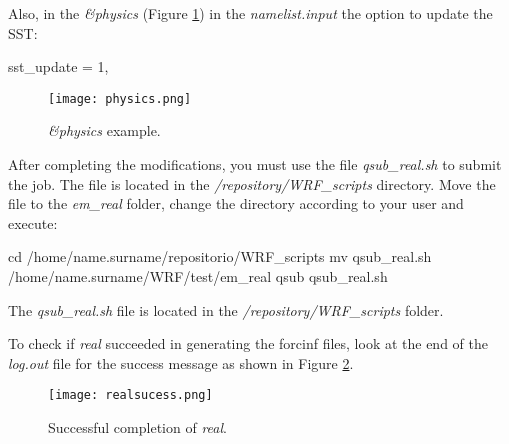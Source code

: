 \noindent Also, in the \textit{\&physics} (Figure \textcolor{bleu_cite}{\ref{physicsnamelist}}) in the \textit{namelist.input} 
the option to update the SST:
\bigskip

\begin{bashcode}
sst_update = 1,
\end{bashcode}
\bigskip

\begin{figure}[H]
    \centering
    \texttt{[image: physics.png]}
    \caption{\textit{\&physics} example.}
    \label{physicsnamelist}
\end{figure}
\bigskip

\noindent After completing the modifications, you must use the file \textit{qsub\_real.sh} to submit the job.
The file is located in the \textit{/repository/WRF\_scripts} directory. Move the file to the \textit{em\_real} folder, change the directory 
according to your user and execute:
\bigskip

\begin{bashcode}
cd /home/name.surname/repositorio/WRF_scripts
mv qsub_real.sh /home/name.surname/WRF/test/em_real
qsub qsub_real.sh
\end{bashcode}
\bigskip

\begin{tcolorbox}[enhanced,
  grow to left by=0cm,%
  grow to right by=0cm,%
  enlarge top by=0cm,%
  enlarge bottom by=0cm,%
  tcbox raise base,
  boxrule=1.0pt,
  left=18mm,
  colframe=yellow!50!black,coltext=yellow!25!black,colback=yellow!10!white,
  overlay={\begin{tcbclipinterior}\fill[yellow!75!blue!50!white] (frame.south west)
    rectangle node[text=white,font=\sffamily\bfseries\footnotesize,rotate=0] {ATTENTION} ([xshift=18mm]frame.north west);\end{tcbclipinterior}}]
The \textit{qsub\_real.sh} file is located in the \textit{/repository/WRF\_scripts} folder.
\end{tcolorbox}
\bigskip

\noindent To check if \textit{real} succeeded in generating the forcinf files, look at the end of the \textit{log.out} file for the success message 
as shown in Figure \textcolor{bleu_cite}{\ref{realfinish}}.
\bigskip

\begin{figure}[H]
    \centering
    \texttt{[image: realsucess.png]}
    \caption{Successful completion of \textit{real}.}
    \label{realfinish}
\end{figure}
\bigskip


